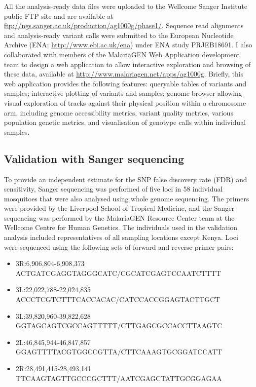 \documentclass[a4paper,11pt,abstracton,hidelinks]{scrartcl}
\begin{document}
All the analysis-ready data files were uploaded to the Wellcome Sanger Institute public FTP site and are available at \url{ftp://ngs.sanger.ac.uk/production/ag1000g/phase1/}.
%
Sequence read alignments and analysis-ready variant calls were submitted to the European Nucleotide Archive (ENA; \url{http://www.ebi.ac.uk/ena}) under ENA study PRJEB18691.
%
I also collaborated with members of the MalariaGEN Web Application development team to design a web application to allow interactive exploration and browsing of these data, available at \url{http://www.malariagen.net/apps/ag1000g}.
%
Briefly, this web application provides the following features: queryable tables of variants and samples;
interactive plotting of variants and samples;
genome browser allowing visual exploration of tracks against their physical position within a chromosome arm, including genome accessibility metrics, variant quality metrics, various population genetic metrics, and visualisation of genotype calls within individual samples.


\subsection{Validation with Sanger sequencing}\label{subsec:validation-with-sanger-sequencing}


To provide an independent estimate for the SNP false discovery rate (FDR) and sensitivity, Sanger sequencing was performed of five loci in 58 individual mosquitoes that were also analysed using whole genome sequencing.
%
The primers were provided by the Liverpool School of Tropical Medicine, and the Sanger sequencing was performed by the MalariaGEN Resource Center team at the Wellcome Centre for Human Genetics.
%
The individuals used in the validation analysis included representatives of all sampling locations except Kenya.
%
Loci were sequenced using the following sets of forward and reverse primer pairs: 
%
\begin{itemize}
\item 3R:6,906,804-6,908,373 \\ ACTGATCGAGGTAGGGCATC/CGCATCGAGTCCAATCTTTT
\item 3L:22,022,788-22,024,835 \\ ACCCTCGTCTTTCACCACAC/CATCCACCGGAGTACTTGCT
\item 3L:39,820,960-39,822,628 \\ GGTAGCAGTCGCCAGTTTTT/CTTGAGCGCCACCTTAAGTC
\item 2L:46,845,944-46,847,857 \\ GGAGTTTTACGTGGCCGTTA/CTTCAAAGTGCGGATCCATT 
\item 2R:28,491,415-28,493,141 \\ TTCAAGTAGTTGCCCGCTTT/AATCGAGCTATTGCGGAGAA
\end{itemize}
\end{document}
